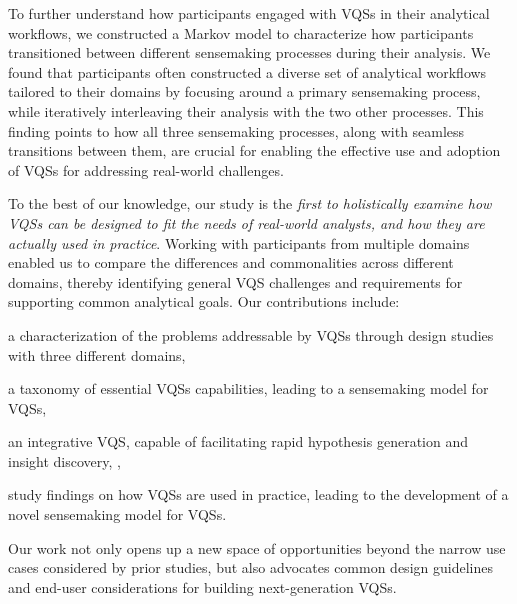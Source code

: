  \par To further understand how participants engaged with VQSs in their analytical workflows, we constructed a Markov model to characterize how participants transitioned between different sensemaking processes during their analysis. We found that participants often constructed a diverse set of analytical workflows tailored to their domains by focusing around a primary sensemaking process, while iteratively interleaving their analysis with the two other processes. This finding points to how all three sensemaking processes, along with seamless transitions between them, are crucial for enabling the effective use and adoption of VQSs for addressing real-world challenges.%
 \par To the best of our knowledge, our study is the \emph{first to holistically examine how VQSs can be designed to fit the needs of real-world analysts, and how they are actually used in practice}. Working with participants from multiple domains enabled us to compare the differences and commonalities across different domains, thereby identifying general VQS challenges and requirements for supporting common analytical goals. Our contributions include:
 \begin{denselist}
 \item a characterization of the problems addressable by VQSs through design studies with three different domains,
 \item a taxonomy of essential VQSs capabilities, leading to a sensemaking model for VQSs, %
 \item an integrative VQS, \zvpp{} capable of facilitating rapid hypothesis generation and insight discovery, , 
 \item study findings on how VQSs are used in practice, leading to the development of a novel sensemaking model for VQSs. %
 \end{denselist}
 Our work not only opens up a new space of opportunities beyond the narrow use cases considered by prior studies, but also advocates common design guidelines and end-user considerations for building next-generation VQSs.